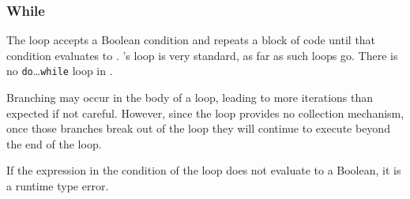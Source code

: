 \subsubsection{While}

The  loop accepts a Boolean condition and repeats a block of code
until that condition evaluates to . \Trilogy{}'s  loop is
very standard, as far as such loops go. There is no \texttt{do}\dots\texttt{while}
loop in \Trilogy{}.

\begin{bnf*}
\end{bnf*}

Branching may occur in the body of a  loop, leading to more iterations
than expected if not careful. However, since the  loop provides no collection
mechanism, once those branches break out of the loop they will continue to execute
beyond the end of the loop.

If the expression in the condition of the  loop does not evaluate to a
Boolean, it is a runtime type error.

\begin{prooftree}
\end{prooftree}

\begin{prooftree}
\end{prooftree}
